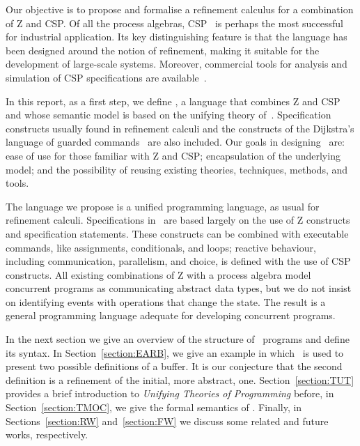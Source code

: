 \documentclass{article}
\begin{document}
Our objective is to propose and formalise a refinement calculus for a
combination of Z and CSP.  Of all the process algebras,
CSP~\cite{Hoa85,Ros98} is perhaps the most successful for industrial
application.  Its key distinguishing feature is that the language has
been designed around the notion of refinement, making it suitable for
the development of large-scale systems.  Moreover, commercial tools
for analysis and simulation of CSP specifications are
available~\cite{FDR99, PROBE98}.

In this report, as a first step, we define \Circus, a language that
combines Z and CSP and whose semantic model is based on the unifying
theory of~\cite{HH98}.  Specification constructs usually found in
refinement calculi and the constructs of the Dijkstra's language of
guarded commands~\cite{Dij76} are also included.  Our goals in
designing \Circus\ are: ease of use for those familiar with Z and CSP;
encapsulation of the underlying model; and the possibility of reusing
existing theories, techniques, methods, and tools.

The language we propose is a unified programming language, as usual
for refinement calculi.  Specifications in \Circus\ are based largely
on the use of Z constructs and specification statements.  These
constructs can be combined with executable commands, like assignments,
conditionals, and loops; reactive behaviour, including communication,
parallelism, and choice, is defined with the use of CSP constructs.
All existing combinations of Z with a process algebra model concurrent
programs as communicating abstract data types, but we do not insist on
identifying events with operations that change the state.  The result
is a general programming language adequate for developing concurrent
programs.

In the next section we give an overview of the structure of \Circus\
programs and define its syntax.  In Section~\ref{section:EARB}, we
give an example in which \Circus\ is used to present two possible
definitions of a buffer.  It is our conjecture that the second
definition is a refinement of the initial, more abstract, one.
Section~\ref{section:TUT} provides a brief introduction to
\emph{Unifying Theories of Programming} before, in
Section~\ref{section:TMOC}, we give the formal semantics of \Circus.
Finally, in Sections~\ref{section:RW} and~\ref{section:FW} we discuss
some related and future works, respectively.

\section{\Circus}\label{section:C}
\end{document}
